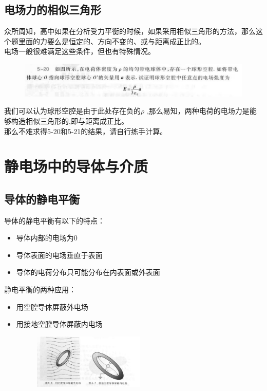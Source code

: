 \documentclass{ctexart}
\begin{document}
\subsection{电场力的相似三角形}
众所周知，高中如果在分析受力平衡的时候，如果采用相似三角形的方法，那么这个题里面的力要么是恒定的、方向不变的、或与距离成正比的。\\
电场一般很难满足这些条件，但也有特殊情况。
\begin{figure}[H]
    \centering
    \includegraphics[width=1\textwidth]{img/x5-20.jpg}
\end{figure}
我们可以认为球形空腔是由于此处存在负的$\rho$ ,那么易知，两种电荷的电场力是能够构造相似三角形的,即与距离成正比。\\
那么不难求得5-20和5-21的结果，请自行练手计算。
\section{静电场中的导体与介质}
\subsection{导体的静电平衡}
导体的静电平衡有以下的特点：
\begin{itemize}
    \item 导体内部的电场为0
    \item 导体表面的电场垂直于表面
    \item 导体的电荷分布只可能分布在内表面或外表面
\end{itemize}
静电平衡的两种应用：
\begin{itemize}
    \item 用空腔导体屏蔽外电场
    \item 用接地空腔导体屏蔽内电场
    \begin{figure}[H]
        \centering
        \includegraphics[width=0.5\textwidth]{img/6-6.jpg}
    \end{figure}
\end{itemize}
\end{document}
